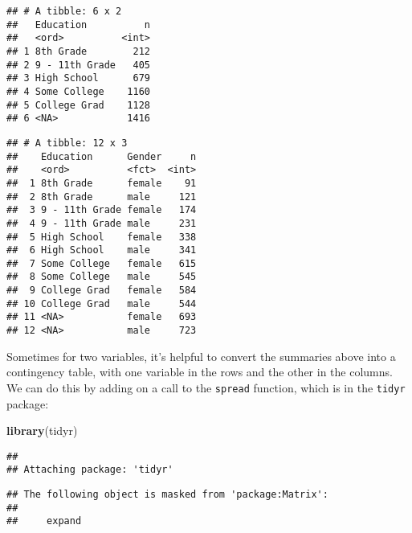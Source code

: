 \documentclass[]{article}
\newenvironment{Shaded}{\begin{snugshade}}{\end{snugshade}}
\newcommand{\KeywordTok}[1]{\textcolor[rgb]{0.13,0.29,0.53}{\textbf{#1}}}
\newcommand{\StringTok}[1]{\textcolor[rgb]{0.31,0.60,0.02}{#1}}
\newcommand{\OperatorTok}[1]{\textcolor[rgb]{0.81,0.36,0.00}{\textbf{#1}}}
\newcommand{\NormalTok}[1]{#1}
\begin{document}
\begin{verbatim}
## # A tibble: 6 x 2
##   Education          n
##   <ord>          <int>
## 1 8th Grade        212
## 2 9 - 11th Grade   405
## 3 High School      679
## 4 Some College    1160
## 5 College Grad    1128
## 6 <NA>            1416
\end{verbatim}

\begin{Shaded}
\end{Shaded}

\begin{verbatim}
## # A tibble: 12 x 3
##    Education      Gender     n
##    <ord>          <fct>  <int>
##  1 8th Grade      female    91
##  2 8th Grade      male     121
##  3 9 - 11th Grade female   174
##  4 9 - 11th Grade male     231
##  5 High School    female   338
##  6 High School    male     341
##  7 Some College   female   615
##  8 Some College   male     545
##  9 College Grad   female   584
## 10 College Grad   male     544
## 11 <NA>           female   693
## 12 <NA>           male     723
\end{verbatim}

Sometimes for two variables, it's helpful to convert the summaries above
into a contingency table, with one variable in the rows and the other in
the columns. We can do this by adding on a call to the \texttt{spread}
function, which is in the \texttt{tidyr} package:

\begin{Shaded}
\begin{Highlighting}[]
\KeywordTok{library}\NormalTok{(tidyr)}
\end{Highlighting}
\end{Shaded}

\begin{verbatim}
## 
## Attaching package: 'tidyr'
\end{verbatim}

\begin{verbatim}
## The following object is masked from 'package:Matrix':
## 
##     expand
\end{verbatim}

\begin{Shaded}
\end{Shaded}
\end{document}
